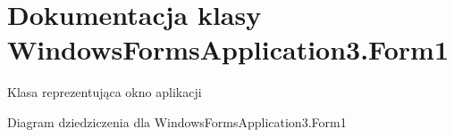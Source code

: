 \hypertarget{class_windows_forms_application3_1_1_form1}{}\section{Dokumentacja klasy Windows\+Forms\+Application3.\+Form1}
\label{class_windows_forms_application3_1_1_form1}


Klasa reprezentująca okno aplikacji  




Diagram dziedziczenia dla Windows\+Forms\+Application3.\+Form1
